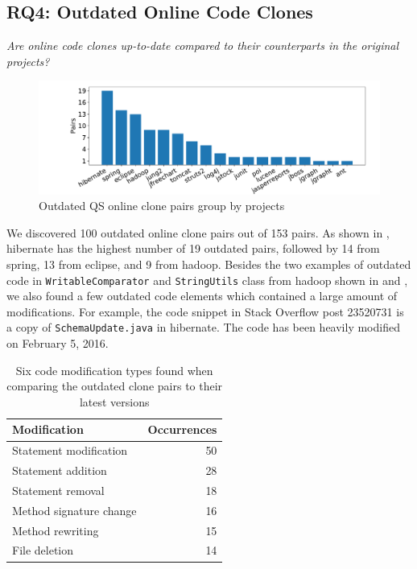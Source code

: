 \documentclass[10pt,journal,compsoc]{IEEEtran}
\begin{document}
\subsection{RQ4: Outdated Online Code Clones}
\vspace{0.25cm}
\textit{Are online code clones up-to-date compared to their counterparts in the original projects?}
\vspace{0.25cm}

\begin{figure}
	\centering
	\includegraphics[width=0.8\linewidth]{outdated}
	\caption{Outdated QS online clone pairs group by projects}
	\label{fig:outdated}
\end{figure}

We discovered 100 outdated online clone pairs out of 153 pairs. As shown in
, \textsf{hibernate} has the highest number of 19 outdated
pairs, followed by 14 from \textsf{spring}, 13 from \textsf{eclipse}, and 9 from
\textsf{hadoop}. Besides the two examples of outdated code in %
{\small{\texttt{WritableComparator}}} and
{\small{\texttt{StringUtils}}} class from \textsf{hadoop} shown in
 and , we also found a few
outdated code elements which contained a large amount of modifications. For
example, the code snippet in Stack Overflow post 23520731 is a copy of
{\small{\texttt{SchemaUpdate.java}}} in \textsf{hibernate}. The code has been
heavily modified on February 5, 2016.


\begin{table}
	\centering
	\caption{Six code modification types found when comparing the outdated clone pairs to their latest versions}
	\label{tab:mod_types}
		\begin{tabular}{lr}
			\toprule
			Modification & Occurrences \\
			\midrule
			Statement modification & 50 \\
			Statement addition & 28 \\
			Statement removal & 18 \\
			Method signature change & 16 \\
			Method rewriting & 15 \\
			File deletion & 14 \\
			\bottomrule 
		\end{tabular}
\end{table}
\end{document}
